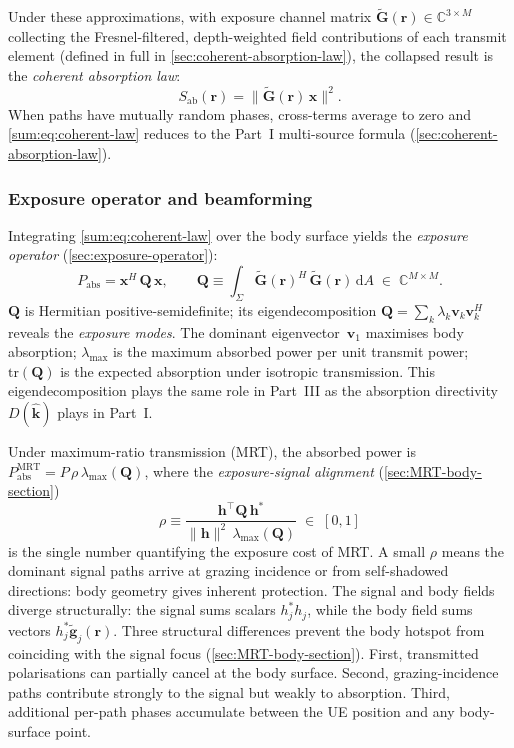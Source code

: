 \documentclass[11pt,a4paper]{article}
\theoremstyle{definition}      %
\newcommand{\khat}{\hat{\bm{k}}}
\newcommand{\rr}{\mathbf{r}}
\newcommand{\Sab}{S_{\mathrm{ab}}}
\newcommand{\diff}{\mathrm{d}}        %
\begin{document}
Under these approximations, with exposure channel matrix
$\tilde{\mathbf{G}}(\rr)\in\mathbb{C}^{3\times M}$ collecting the
Fresnel-filtered, depth-weighted field contributions of each transmit
element (defined in full in \cref{sec:coherent-absorption-law}), the
collapsed result is the \emph{coherent absorption law}:
\begin{equation}\label{sum:eq:coherent-law}
  \boxed{\Sab(\rr) = \|\tilde{\mathbf{G}}(\rr)\,\mathbf{x}\|^2.}
\end{equation}
When paths have mutually random phases, cross-terms average to zero
and \cref{sum:eq:coherent-law} reduces to the Part~I multi-source
formula (\cref{sec:coherent-absorption-law}).

\subsubsection*{Exposure operator and beamforming}

Integrating \cref{sum:eq:coherent-law} over the body surface yields
the \emph{exposure operator} (\cref{sec:exposure-operator}):
\begin{equation}\label{sum:eq:Q-def}
  P_{\mathrm{abs}} = \mathbf{x}^H\,\mathbf{Q}\,\mathbf{x},
  \qquad
  \boxed{\mathbf{Q} \equiv \int_\Sigma
    \tilde{\mathbf{G}}(\rr)^H\,\tilde{\mathbf{G}}(\rr)\,\diff A
    \;\in\;\mathbb{C}^{M\times M}.}
\end{equation}
$\mathbf{Q}$ is Hermitian positive-semidefinite; its eigendecomposition
$\mathbf{Q}=\sum_k\lambda_k\mathbf{v}_k\mathbf{v}_k^H$ reveals the
\emph{exposure modes}.
The dominant eigenvector~$\mathbf{v}_1$ maximises body absorption;
$\lambda_{\max}$ is the maximum absorbed power per unit transmit power;
$\mathrm{tr}(\mathbf{Q})$ is the expected absorption under isotropic
transmission.
This eigendecomposition plays the same role in
Part~III as the absorption directivity $D(\khat)$ plays in Part~I.

Under maximum-ratio transmission (MRT), the absorbed power is
$P^{\mathrm{MRT}}_{\mathrm{abs}}=P\,\rho\,\lambda_{\max}(\mathbf{Q})$,
where the \emph{exposure-signal alignment} (\cref{sec:MRT-body-section})
\begin{equation}\label{sum:eq:rho-def}
  \boxed{\rho \equiv \frac{\mathbf{h}^\top\mathbf{Q}\,\mathbf{h}^*}
    {\|\mathbf{h}\|^2\,\lambda_{\max}(\mathbf{Q})} \;\in\;[0,1]}
\end{equation}
is the single number quantifying the exposure cost of MRT.
A small $\rho$ means the dominant signal paths arrive at grazing
incidence or from self-shadowed directions: body geometry gives inherent
protection.
The signal and body fields diverge structurally: the signal sums
scalars $h_j^*h_j$, while the body field sums vectors
$h_j^*\tilde{\mathbf{g}}_j(\rr)$.
Three structural differences prevent the body hotspot from coinciding
with the signal focus (\cref{sec:MRT-body-section}).
First, transmitted polarisations can partially cancel at the body surface.
Second, grazing-incidence paths contribute strongly to the signal but
weakly to absorption.
Third, additional per-path phases accumulate between the UE position
and any body-surface point.
\end{document}
